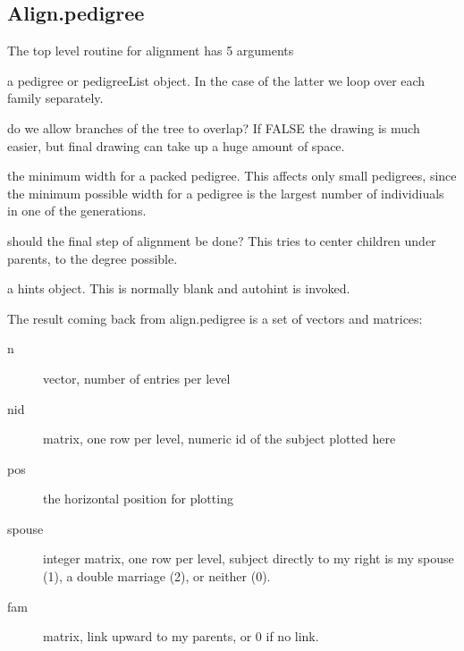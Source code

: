 \documentclass{article}
\begin{document}
\subsection{Align.pedigree}
\label{sect:alignped}
The top level routine for alignment has 5 arguments
\begin{description}
    \item[ped] a pedigree or pedigreeList object. In the case of
      the latter we loop over each family separately.
    \item[packed] do we allow branches of the tree to overlap?  
      If FALSE the drawing is much easier, but final drawing can
      take up a huge amount of space.  
    \item[width] the minimum width for a packed pedigree. This
      affects only small pedigrees, since the minimum possible
      width for a pedigree is the largest number of individiuals in
      one of the generations.
    \item[align] should the final step of alignment be done?  This
      tries to center children under parents, to the degree possible.
    \item a hints object.  This is normally blank and autohint
      is invoked. 
\end{description}
The result coming back from align.pedigree is a set of vectors and
matrices:
\begin{description}
  \item[n] vector, number of entries per level
  \item[nid] matrix, one row per level, numeric id of the subject plotted
    here
  \item[pos] the horizontal position for plotting
  \item[spouse] integer matrix, one row per level, subject directly to my
    right is my spouse (1), a double marriage (2), or neither (0).
  \item[fam] matrix, link upward to my parents, or 0 if no link.
\end{description}
\end{document}
